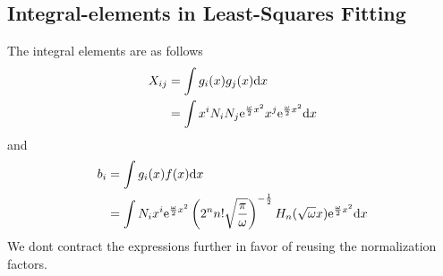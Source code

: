 
\chapter{\label{appendix:B}}

\section{Integral-elements in Least-Squares Fitting}
    The integral elements are as follows
        \begin{align}
            X_{ij} &= \int g_i(x)g_j(x) \mathrm{d} x \nonumber \\
            &= \int x^i N_i N_j \mathrm{e}^{\frac{\omega}{2} x^2} x^j
            \mathrm{e}^{\frac{\omega}{2} x^2} \mathrm{d} x
        \end{align}
    and
        \begin{align}
            b_i &= \int g_i(x)f(x) \mathrm{d} x \nonumber \\
            &= \int N_i x^i \mathrm{e}^{\frac{\omega}{2} x^2}
            \left(2^nn!\sqrt{\frac{\pi}{\omega}}\right)^{-\frac{1}{2}}
            H_n(\sqrt{\omega}x) \mathrm{e}^{\frac{\omega}{2} x^2} \mathrm{d} x
        \end{align}
    We dont contract the expressions further in favor of reusing the
    normalization factors.
